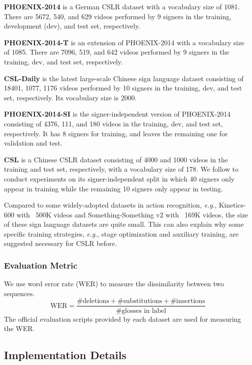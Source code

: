 \documentclass[acmsmall,screen]{acmart}
\def\eg{\emph{e.g.}} \def\Eg{\emph{E.g.}}
\def \tbf{\textbf}
\begin{document}
\tbf{PHOENIX-2014} \cite{2014} is a German CSLR dataset with a vocabulary size of 1081. There are 5672, 540, and 629 videos performed by 9 signers in the training, development (dev), and test set, respectively. 

\tbf{PHOENIX-2014-T} \cite{2014T} is an extension of PHOENIX-2014 with a vocabulary size of 1085. 
There are 7096, 519, and 642 videos performed by 9 signers in the training, dev, and test set, respectively. 

\tbf{CSL-Daily} \cite{zhou2021improving} is the latest large-scale Chinese sign language dataset consisting of 18401, 1077, 1176 videos performed by 10 signers in the training, dev, and test set, respectively. Its vocabulary size is 2000.

\tbf{PHOENIX-2014-SI} \cite{2014} is the signer-independent version of PHOENIX-2014 consisting of 4376, 111, and 180 videos in the training, dev, and test set, respectively. It has 8 signers for training, and leaves the remaining one for validation and test. 

\tbf{CSL} \cite{iopt, csl-2, csl-3} is a Chinese CSLR dataset consisting of 4000 and 1000 videos in the training and test set, respectively, with a vocabulary size of 178. 
We follow \cite{fcn, vac} to conduct experiments on its signer-independent split in which 40 signers only appear in training while the remaining 10 signers only appear in testing.

Compared to some widely-adopted datasets in action recognition, \eg, Kinetics-600 \cite{k600} with ~500K videos and Something-Something v2 \cite{sthsthv2} with ~169K videos, the size of these sign language datasets are quite small. This can also explain why some specific training strategies, \eg, stage optimization and auxiliary training, are suggested necessary for CSLR before.


\subsubsection{Evaluation Metric}
We use word error rate (WER) to measure the dissimilarity between two sequences.
\begin{equation}
    \text{WER} = \frac{\#\text{deletions} + \#\text{substitutions} + \#\text{insertions}}{\#\text{glosses in label}}
\end{equation}
The official evaluation scripts provided by each dataset are used for measuring the WER.


\subsection{Implementation Details}
\end{document}
